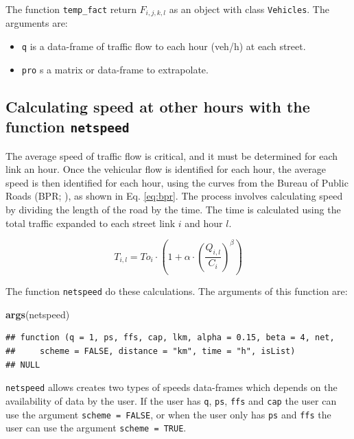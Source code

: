 \documentclass[12pt,graybox,envcountchap,sectrefs]{krantz}
\makeatletter
\newenvironment{Shaded}{\begin{snugshade}}{\end{snugshade}}
\newcommand{\KeywordTok}[1]{\textcolor[rgb]{0.13,0.29,0.53}{\textbf{#1}}}
\newcommand{\NormalTok}[1]{#1}
\providecommand{\tightlist}{%
  \setlength{\itemsep}{0pt}\setlength{\parskip}{0pt}}
\newenvironment{kframe}{%
\medskip{}
\setlength{\fboxsep}{.8em}
 \def\at@end@of@kframe{}%
 \ifinner\ifhmode%
  \def\at@end@of@kframe{\end{minipage}}%
  \begin{minipage}{\columnwidth}%
 \fi\fi%
 \def\FrameCommand##1{\hskip\@totalleftmargin \hskip-\fboxsep
 \colorbox{shadecolor}{##1}\hskip-\fboxsep
     \hskip-\linewidth \hskip-\@totalleftmargin \hskip\columnwidth}%
 \MakeFramed {\advance\hsize-\width
   \@totalleftmargin\z@ \linewidth\hsize
   \@setminipage}}%
 {\par\unskip\endMakeFramed%
 \at@end@of@kframe}
\renewenvironment{Shaded}{\begin{kframe}}{\end{kframe}}
\theoremstyle{definition}
\theoremstyle{definition}
\theoremstyle{definition}
\theoremstyle{remark}
\makeatother
\begin{document}
The function \texttt{temp\_fact} return \(F_{i,j,k,l}\) as an object
with class \texttt{Vehicles}. The arguments are:

\begin{itemize}
\tightlist
\item
  \texttt{q} is a data-frame of traffic flow to each hour (veh/h) at
  each street.
\item
  \texttt{pro} s a matrix or data-frame to extrapolate.
\end{itemize}

\subsection{\texorpdfstring{Calculating speed at other hours with the
function
\texttt{netspeed}}{Calculating speed at other hours with the function netspeed}}\label{calculating-speed-at-other-hours-with-the-function-netspeed}

The average speed of traffic flow is critical, and it must be determined
for each link an hour. Once the vehicular flow is identified for each
hour, the average speed is then identified for each hour, using the
curves from the Bureau of Public Roads (BPR; \citep{bpr}), as shown in
Eq. \eqref{eq:bpr}. The process involves calculating speed by dividing the
length of the road by the time. The time is calculated using the total
traffic expanded to each street link \(i\) and hour \(l\).

\begin{equation}
T_{i,l} = To_i \cdot \left(1 +\alpha \cdot \left(\dfrac{Q_{i,l}}{C_i}\right)^\beta \right)
\label{eq:bpr}
\end{equation}

The function \texttt{netspeed} do these calculations. The arguments of
this function are:

\begin{Shaded}
\begin{Highlighting}[]
\KeywordTok{args}\NormalTok{(netspeed)}
\end{Highlighting}
\end{Shaded}

\begin{verbatim}
## function (q = 1, ps, ffs, cap, lkm, alpha = 0.15, beta = 4, net, 
##     scheme = FALSE, distance = "km", time = "h", isList) 
## NULL
\end{verbatim}

\texttt{netspeed} allows creates two types of speeds data-frames which
depends on the availability of data by the user. If the user has
\texttt{q}, \texttt{ps}, \texttt{ffs} and \texttt{cap} the user can use
the argument \texttt{scheme\ =\ FALSE}, or when the user only has
\texttt{ps} and \texttt{ffs} the user can use the argument
\texttt{scheme\ =\ TRUE}.
\end{document}
